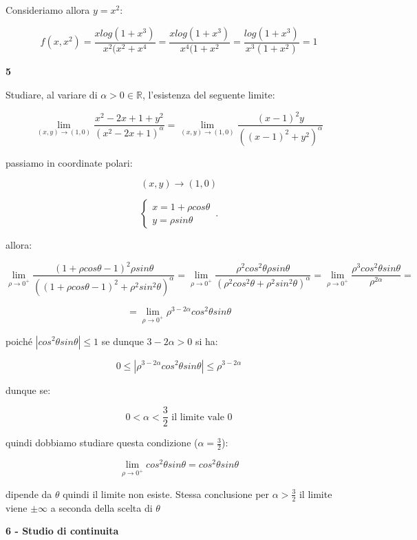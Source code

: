 \documentclass[11pt]{article}
\begin{document}
Consideriamo allora $y=x^{2}$:

\[
    f(x,x^{2})= \frac{xlog(1+x^{3})}{x^{2}(x^{2}+x^{4}} = \frac{xlog(1+x^{3})}{x^{4}(1+x^{2}}= \frac{log(1+x^{3})}{x^{3}(1+x^{2})} = 1
\]
 

\textbf{5} 

Studiare, al variare di $\alpha >0 \in \mathbb{R}$, l'esistenza del seguente limite:

\[
    \lim_{ (x,y) \to (1,0) } \frac{x^{2}-2x+1+y^{2}}{(x^{2}-2x+1)^{\alpha}} = \lim_{ (x,y) \to (1,0) } \frac{(x-1)^{2}y}{((x-1)^{2}+y^{2})^{\alpha}} 
\]

passiamo in coordinate polari:

\[
    (x,y) \rightarrow (1,0)
\]

\begin{equation}
    \begin{cases}
           x = 1+\rho cos \theta\\
           y = \rho sin\theta
    \end{cases}\,.
\end{equation}


allora:

\[
    \lim_{ \rho \to 0^{+} } \frac{(1 + \rho cos\theta -1 )^{2} \rho sin\theta}{((1+\rho cos\theta -1)^{2}+\rho^{2}sin^{2}\theta)^{\alpha}} = \lim_{ \rho \to 0^{+} } \frac{\rho^{2}cos^{2}\theta\rho sin\theta}{(\rho^{2}cos^{2}\theta+\rho^{2}sin^{2}\theta)^{\alpha}} = \lim_{ \rho \to 0^{+} } \frac{\rho^{3}cos^{2}\theta sin \theta}{\rho ^{2 \alpha}} =
\]


\[
    = \lim_{ \rho \to 0^{+} } \rho^{3-2 \alpha} cos^{2}\theta sin \theta
\]

poiché $|cos^{2}\theta sin\theta|\le 1$ se dunque $3-2 \alpha >0$ si ha:

\[
    0 \le |\rho^{3-2 \alpha}cos^{2}\theta sin \theta | \le \rho^{3-2 \alpha}
\]


dunque se:

\[
    0 < \alpha < \frac{3}{2} \text{ il limite vale 0}
\]

quindi dobbiamo studiare questa condizione ($\alpha=\frac{3}{2}$):

\[
    \lim_{ \rho \to 0^{+} } cos^{2}\theta sin \theta = cos^{2}\theta sin \theta
\]

dipende da $\theta$ quindi il limite non esiste. Stessa conclusione per $\alpha>\frac{3}{2}$ il limite viene $\pm \infty$ a seconda della scelta di $\theta$

\textbf{6 - Studio di continuita }
\end{document}
